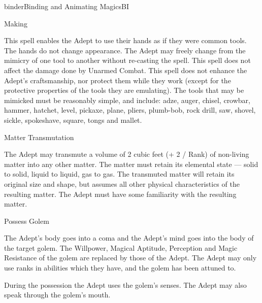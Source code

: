 \begin{College}[1.2]{binder}{Binding and Animating Magics}{BI}
\begin{spell}[S-8]{Making}
\begin{effects}
This spell enables the Adept to use their hands as if they were common
tools. The hands do not change appearance.  The Adept may freely
change from the mimicry of one tool to another without re-casting the
spell.  This spell does not affect the damage done by Unarmed Combat.
This spell does not enhance the Adept’s craftsmanship, nor protect
them while they work (except for the protective properties of the
tools they are emulating).  The tools that may be mimicked must be
reasonably simple, and include: adze, auger, chisel, crowbar, hammer,
hatchet, level, pickaxe, plane, pliers, plumb-bob, rock drill, saw,
shovel, sickle, spokeshave, square, tongs and mallet.
\end{effects}
\end{spell}

\begin{spell}[S-9]{Matter Transmutation}

\begin{effects}
The Adept may transmute a volume of 2 cubic feet (+ 2 / Rank) of
non-living matter into any other matter.  The matter must retain its
elemental state --- solid to solid, liquid to liquid, gas to gas.  The
transmuted matter will retain its original size and shape, but assumes
all other physical characteristics of the resulting matter.  The Adept
must have some familiarity with the resulting matter.
\end{effects}
\end{spell}

\begin{spell}[S-10]{Possess Golem}

\begin{effects}
The Adept’s body goes into a coma and the Adept’s mind goes into the
body of the target golem.  The Willpower, Magical Aptitude, Perception
and Magic Resistance of the golem are replaced by those of the Adept.
The Adept may only use ranks in abilities which they have, and the
golem has been attuned to.

During the possession the Adept uses the golem’s senses.  The Adept
may also speak through the golem’s mouth.


\end{effects}
\end{spell}
\end{College}
